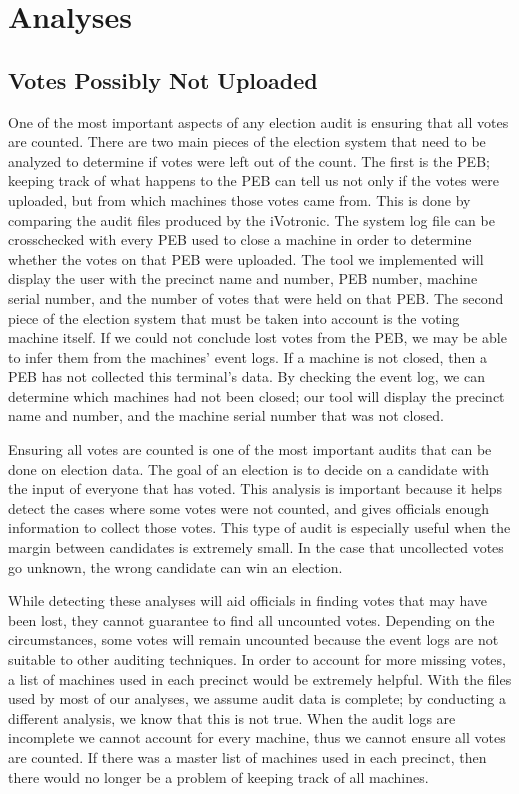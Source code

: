 \section{Analyses}
\subsection{Votes Possibly Not Uploaded}
One of the most important aspects of any election audit is ensuring that all votes are counted.  There are two main pieces of the election system that need to be analyzed to determine if votes were left out of the count.  The first is the PEB; keeping track of what happens to the PEB can tell us not only if the votes were uploaded, but from which machines those votes came from.  This is done by comparing the audit files produced by the iVotronic.  The system log file can be crosschecked with every PEB used to close a machine in order to determine whether the votes on that PEB were uploaded.  The tool we implemented will display the user with the precinct name and number, PEB number, machine serial number, and the number of votes that were held on that PEB.  The second piece of the election system that must be taken into account is the voting machine itself.  If we could not conclude lost votes from the PEB, we may be able to infer them from the machines' event logs.  If a machine is not closed, then a PEB has not collected this terminal's data.  By checking the event log, we can determine which machines had not been closed; our tool will display the precinct name and number, and the machine serial number that was not closed. 

Ensuring all votes are counted is one of the most important audits that can be done on election data.  The goal of an election is to decide on a candidate with the input of everyone that has voted.  This analysis is important because it helps detect the cases where some votes were not counted, and gives officials enough information to collect those votes.  This type of audit is especially useful when the margin between candidates is extremely small.  In the case that uncollected votes go unknown, the wrong candidate can win an election.  

While detecting these analyses will aid officials in finding votes that may have been lost, they cannot guarantee to find all uncounted votes.  Depending on the circumstances, some votes will remain uncounted because the event logs are not suitable to other auditing techniques.  In order to account for more missing votes, a list of machines used in each precinct would be extremely helpful.  With the files used by most of our analyses, we assume audit data is complete; by conducting a different analysis, we know that this is not true.  When the audit logs are incomplete we cannot account for every machine, thus we cannot ensure all votes are counted.  If there was a master list of machines used in each precinct, then there would no longer be a problem of keeping track of all machines.  
 
